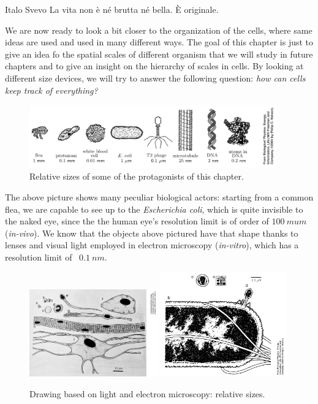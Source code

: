 \documentclass[../main/main.tex]{subfiles}
\begin{document}
\begin{chapquote}{Italo Svevo}
    La vita non è né brutta né bella. È originale.
\end{chapquote}

We are now ready to look a bit closer to the organization of the cells, where same ideas are used and used in many different ways.  The goal of this chapter is just to give an idea fo the spatial scales of different organism that we will study in future chapters and to give an insight on the hierarchy of scales in cells. By looking at different size devices, we will try to answer the following question: \emph{how can cells keep track of everything?}  
\begin{figure}[h!]
    \centering
    \includegraphics[width=0.95\textwidth]{../frontespizio/tikz/1_lesson/spatial_scales.PNG}
    \caption{Relative sizes of some of the protagonists of this chapter.}    
\end{figure}
The above picture shows many peculiar biological actors: starting from a common flea, we are capable to see up to the \emph{Escherichia coli}, which is quite invisible to the naked eye, since the the human eye's resolution limit is of order of $100\: mu m$ (\emph{in-vivo}). We know that the objects above pictured have that shape thanks to lenses and visual light employed in electron microscopy (\emph{in-vitro}), which has a resolution limit of ~$0.1\:nm$.

\begin{figure}[h!] 
    \centering
    \includegraphics[width=0.49\textwidth]{../frontespizio/tikz/1_lesson/Drawing.jpg}
    \includegraphics[width=0.49\textwidth]{../frontespizio/tikz/1_lesson/drawing_electron.PNG}
    \caption{\label{fig:2_2} Drawing based on light and electron microscopy: relative sizes.} 
\end{figure}
\end{document}
